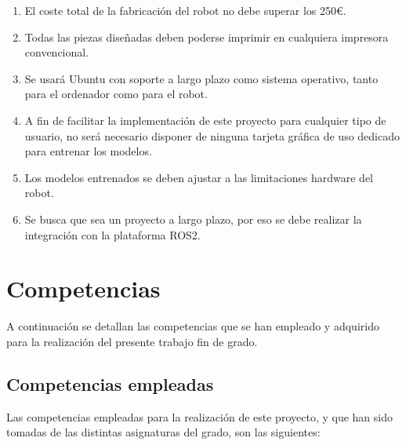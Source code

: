\begin{enumerate}
	\item{} El coste total de la fabricación del robot no debe superar los 250€.
	\item{} Todas las piezas diseñadas deben poderse imprimir en cualquiera impresora convencional.
	\item{} Se usará Ubuntu con soporte a largo plazo como sistema operativo, tanto para el ordenador como para el robot.
	\item{} A fin de facilitar la implementación de este proyecto para cualquier tipo de usuario, no será necesario disponer de ninguna tarjeta gráfica de uso dedicado para entrenar los modelos. 
	\item{} Los modelos entrenados se deben ajustar a las limitaciones hardware del robot.
	\item{} Se busca que sea un proyecto a largo plazo, por eso se debe realizar la integración con la plataforma ROS2. 
	
	
\end{enumerate}

\section{Competencias}

A continuación se detallan las competencias que se han empleado y adquirido para la realización del presente trabajo fin de grado.
   
\subsection{Competencias empleadas}
Las competencias empleadas para la realización de este proyecto, y que han sido tomadas de las distintas asignaturas del grado, son las siguientes: 


